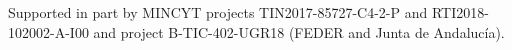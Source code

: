 \documentclass[10pt,journal,compsoc]{IEEEtran}
\begin{document}
Supported in part by MINCYT projects
TIN2017-85727-C4-2-P and  RTI2018-102002-A-I00 and project
B-TIC-402-UGR18 (FEDER and Junta de Andaluc\'{i}a).











\end{document}
